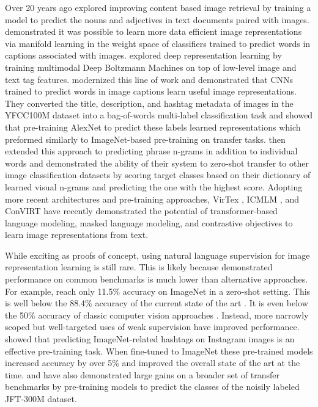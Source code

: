 \documentclass{article}
\begin{document}
Over 20 years ago \citet{mori1999image} explored improving content based image retrieval by training a model to predict the nouns and adjectives in text documents paired with images. \citet{quattoni2007learning} demonstrated it was possible to learn more data efficient image representations via manifold learning in the weight space of classifiers trained to predict words in captions associated with images. \citet{srivastava2012multimodal} explored deep representation learning by training multimodal Deep Boltzmann Machines on top of low-level image and text tag features. \citet{joulin2016learning} modernized this line of work and demonstrated that CNNs trained to predict words in image captions learn useful image representations. They converted the title, description, and hashtag metadata of images in the YFCC100M dataset \citep{thomee2016yfcc100m} into a bag-of-words multi-label classification task and showed that pre-training AlexNet \citep{krizhevsky2012imagenet} to predict these labels learned representations which preformed similarly to ImageNet-based pre-training on transfer tasks. \citet{li2017learning} then extended this approach to predicting phrase n-grams in addition to individual words and demonstrated the ability of their system to zero-shot transfer to other image classification datasets by scoring target classes based on their dictionary of learned visual n-grams and predicting the one with the highest score. Adopting more recent architectures and pre-training approaches, VirTex \citep{desai2020virtex}, ICMLM \citep{bulent2020learning}, and ConVIRT \citep{zhang2020contrastive} have recently demonstrated the potential of transformer-based language modeling, masked language modeling, and contrastive objectives to learn image representations from text.


While exciting as proofs of concept, using natural language supervision for image representation learning is still rare. This is likely because demonstrated performance on common benchmarks is much lower than alternative approaches. For example, \citet{li2017learning} reach only 11.5\% accuracy on ImageNet in a zero-shot setting. This is well below the 88.4\% accuracy of the current state of the art \citep{xie2020self}. It is even below the 50\% accuracy of classic computer vision approaches \citep{ILSVRC2012}. Instead, more narrowly scoped but well-targeted uses of weak supervision have improved performance. \citet{mahajan2018exploring} showed that predicting ImageNet-related hashtags on Instagram images is an effective pre-training task. When fine-tuned to ImageNet these pre-trained models increased accuracy by over 5\% and improved the overall state of the art at the time. \citet{kolesnikov2019large} and \citet{dosovitskiy2020image} have also demonstrated large gains on a broader set of transfer benchmarks by pre-training models to predict the classes of the noisily labeled JFT-300M dataset. 
\end{document}
